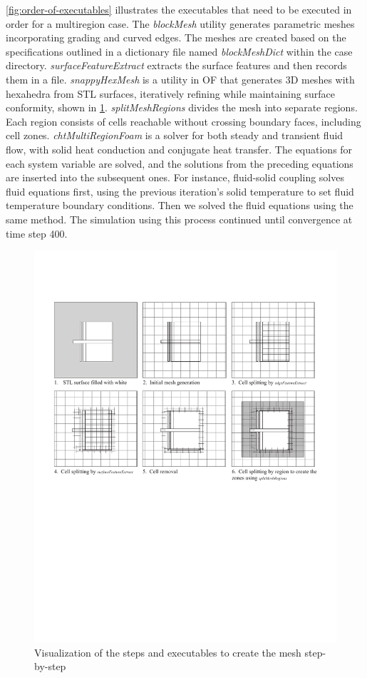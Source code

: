 \ref{fig:order-of-executables} illustrates the executables that need to be executed in order for a multiregion case.
The \textit{blockMesh} utility generates parametric meshes incorporating grading and curved edges. 
The meshes are created based on the specifications outlined in a dictionary file named \textit{blockMeshDict}  within the case directory.
\textit{surfaceFeatureExtract} extracts the surface features and then records them in a file.      
\textit{snappyHexMesh} is a utility in  \gls{OF} that generates 3D meshes with hexahedra from STL surfaces, iteratively refining while maintaining surface conformity, shown in \ref{meshsteps}.
\textit{splitMeshRegions} divides the mesh into separate regions. Each region consists of cells reachable without crossing boundary faces, including cell zones.
\textit{chtMultiRegionFoam} is a solver for both steady and transient fluid flow, with solid heat conduction and conjugate heat transfer. The equations for each system variable are solved, and the solutions from the preceding equations are inserted into the subsequent ones. For instance, fluid-solid coupling solves fluid equations first, using the previous iteration's solid temperature to set fluid temperature boundary conditions. Then we solved the fluid equations using the same method. The simulation using this process continued until convergence at time step 400.
    
\begin{figure}[htb]
     \centering
    \includegraphics[trim=1cm 11cm 1cm 3cm, clip, width=0.9\linewidth]{Figures/snappyhex.pdf}
     \caption[Mesh Creation Steps]{Visualization of the steps and executables to create the mesh step-by-step}
   \label{meshsteps}
 \end{figure}



